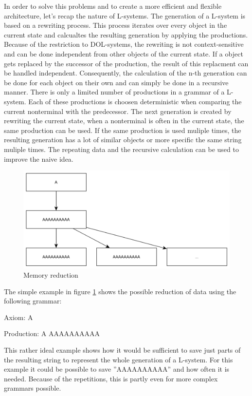 \documentclass[english]{cpp-hmwk}
\begin{document}
\medskip
\noindent In order to solve this problems and to create a more efficient and flexible architecture, let's recap the nature of L-systems. The generation of a L-system is based on a rewriting process. This process iterates over every object in the current state and calcualtes the resulting generation by applying the productions. Because of the restriction to DOL-systems, the rewriting is not context-sensitive and can be done independent from other objects of the current state. If a object gets replaced by the successor of the production, the result of this replacment can be handled independent. Consequently, the calculation of the n-th generation can be done for each object on their own and can simply be done in a recursive manner.\newline
There is only a limited number of productions in a grammar of a L-system. Each of these productions is choosen deterministic when comparing the current nonterminal with the predecessor. The next generation is created by rewriting the current state, when a nonterminal is often in the current state, the same production can be used. If the same production is used muliple times, the resulting generation has a lot of similar objects or more specific the same string muliple times. The repeating data and the recursive calculation can be used to improve the naive idea.

\medskip
\begin{figure}[h!]
	\centering
	\includegraphics[width=0.8\columnwidth]{../graphs/LSystem/examples/simple_grammar_data_doubling.png}
	\caption{Memory reduction}
	\label{figure:lsystem_mem_reduction}
\end{figure}

\noindent The simple example in figure \ref{figure:lsystem_mem_reduction} shows the possible reduction of data using the following grammar:

Axiom: A

Production: A \rightarrow AAAAAAAAAA 

\medskip
\noindent This rather ideal example shows how it would be sufficient to save just parts of the resulting string to represent the whole generation of a L-system. For this example it could be possible to save ''AAAAAAAAAA'' and how often it is needed. Because of the repetitions, this is partly even for more complex grammars possible.
\end{document}
